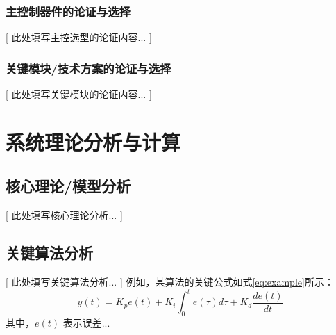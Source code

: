 \documentclass{ctexart}
\begin{document}
\subsubsection{主控制器件的论证与选择}
    [ 此处填写主控选型的论证内容... ]

\subsubsection{关键模块/技术方案的论证与选择}
    [ 此处填写关键模块的论证内容... ]

\section{系统理论分析与计算}
\subsection{核心理论/模型分析}
    [ 此处填写核心理论分析... ]
    
    
\subsection{关键算法分析}
    [ 此处填写关键算法分析... ]
    例如，某算法的关键公式如式\ref{eq:example}所示：
    \begin{equation} \label{eq:example}
        y(t) = K_p e(t) + K_i \int_0^t e(\tau)d\tau + K_d \frac{de(t)}{dt}
    \end{equation}
    其中，$e(t)$ 表示误差... %
\end{document}
